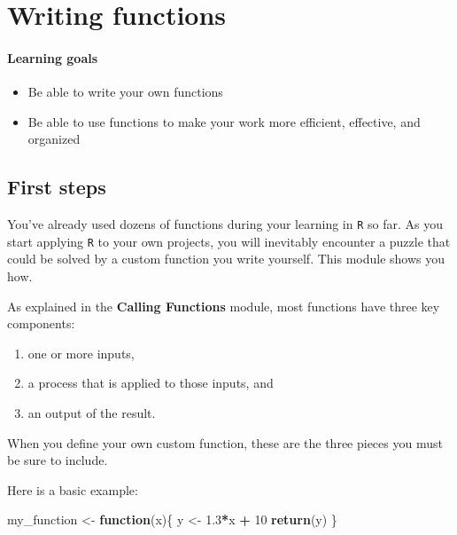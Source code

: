 \documentclass[
]{book}
\newenvironment{Shaded}{\begin{snugshade}}{\end{snugshade}}
\newcommand{\ControlFlowTok}[1]{\textcolor[rgb]{0.13,0.29,0.53}{\textbf{#1}}}
\newcommand{\DecValTok}[1]{\textcolor[rgb]{0.00,0.00,0.81}{#1}}
\newcommand{\FloatTok}[1]{\textcolor[rgb]{0.00,0.00,0.81}{#1}}
\newcommand{\KeywordTok}[1]{\textcolor[rgb]{0.13,0.29,0.53}{\textbf{#1}}}
\newcommand{\NormalTok}[1]{#1}
\newcommand{\OperatorTok}[1]{\textcolor[rgb]{0.81,0.36,0.00}{\textbf{#1}}}
\newcommand{\StringTok}[1]{\textcolor[rgb]{0.31,0.60,0.02}{#1}}
\providecommand{\tightlist}{%
  \setlength{\itemsep}{0pt}\setlength{\parskip}{0pt}}
\begin{document}
\hypertarget{writing-functions}{%
\chapter{Writing functions}\label{writing-functions}}

\hypertarget{learning-goals-15}{%
\subsubsection*{Learning goals}\label{learning-goals-15}}

\begin{itemize}
\tightlist
\item
  Be able to write your own functions
\item
  Be able to use functions to make your work more efficient, effective, and organized
\end{itemize}

\hypertarget{first-steps}{%
\section*{First steps}\label{first-steps}}

You've already used dozens of functions during your learning in \texttt{R} so far. As you start applying \texttt{R} to your own projects, you will inevitably encounter a puzzle that could be solved by a custom function you write yourself. This module shows you how.

As explained in the \textbf{Calling Functions} module, most functions have three key components:

\begin{enumerate}
\def\labelenumi{(\arabic{enumi})}
\tightlist
\item
  one or more inputs,\\
\item
  a process that is applied to those inputs, and\\
\item
  an output of the result.
\end{enumerate}

When you define your own custom function, these are the three pieces you must be sure to include.

Here is a basic example:

\begin{Shaded}
\begin{Highlighting}[]
\NormalTok{my_function <-}\StringTok{ }\ControlFlowTok{function}\NormalTok{(x)\{}
\NormalTok{  y <-}\StringTok{ }\FloatTok{1.3}\OperatorTok{*}\NormalTok{x }\OperatorTok{+}\StringTok{ }\DecValTok{10}
  \KeywordTok{return}\NormalTok{(y)}
\NormalTok{\}}
\end{Highlighting}
\end{Shaded}
\end{document}
